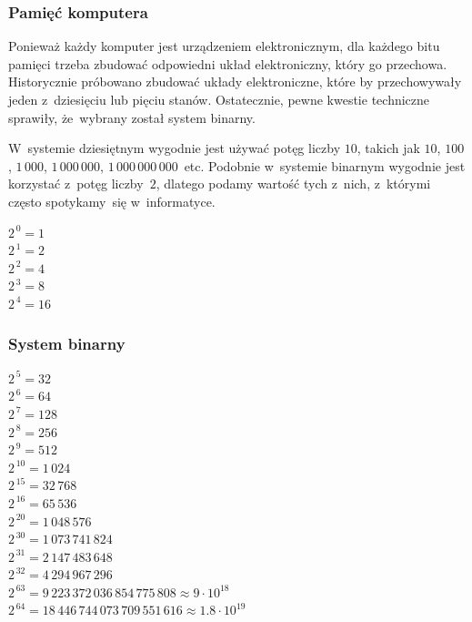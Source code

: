 \documentclass[10pt,t]{beamer}
\begin{document}
\begin{frame}
  \frametitle{Pamięć komputera}


  Ponieważ każdy komputer jest urządzeniem elektronicznym, dla każdego bitu
  pamięci trzeba zbudować odpowiedni układ elektroniczny, który go
  przechowa. Historycznie próbowano zbudować układy elektroniczne, które
  by przechowywały jeden z~dziesięciu lub pięciu stanów. Ostatecznie, pewne
  kwestie techniczne sprawiły, że~wybrany został system binarny.

  W~systemie dziesiętnym wygodnie jest używać potęg liczby $10$, takich jak
  $10$, $100$, $1 \, 000$, $1 \, 000 \, 000$, $1 \, 000 \, 000 \, 000$~etc.
  Podobnie w~systemie binarnym wygodnie jest korzystać z~potęg liczby~$2$,
  dlatego podamy wartość tych z~nich, z~którymi często spotykamy~się
  w~informatyce.

  $2^{ \, 0 } = 1$ \\
  $2^{ \, 1 } = 2$ \\
  $2^{ \, 2 } = 4$ \\
  $2^{ \, 3 } = 8$ \\
  $2^{ \, 4 } = 16$

\end{frame}





\begin{frame}
  \frametitle{System binarny}


  $2^{ \, 5 } = 32$ \\
  $2^{ \, 6 } = 64$ \\
  $2^{ \, 7 } = 128$ \\
  $2^{ \, 8 } = 256$ \\
  $2^{ \, 9 } = 512$ \\
  $2^{ \, 10 } = 1 \, 024$ \\
  $2^{ \, 15 } = 32 \, 768$ \\
  $2^{ \, 16 } = 65 \, 536$ \\
  $2^{ \, 20 } = 1 \, 048 \, 576$ \\
  $2^{ \, 30 } = 1 \, 073 \, 741 \, 824$ \\
  $2^{ \, 31 } = 2 \, 147 \, 483 \, 648$ \\
  $2^{ \, 32 } = 4 \, 294 \, 967 \, 296$ \\
  $2^{ \, 63 } = 9 \, 223 \, 372 \, 036 \, 854 \, 775 \, 808
  \approx 9 \cdot 10^{ 18 }$ \\
  $2^{ \, 64 } = 18 \, 446 \, 744 \, 073 \, 709 \, 551 \, 616
  \approx 1.8 \cdot 10^{ 19 }$

\end{frame}
\end{document}
